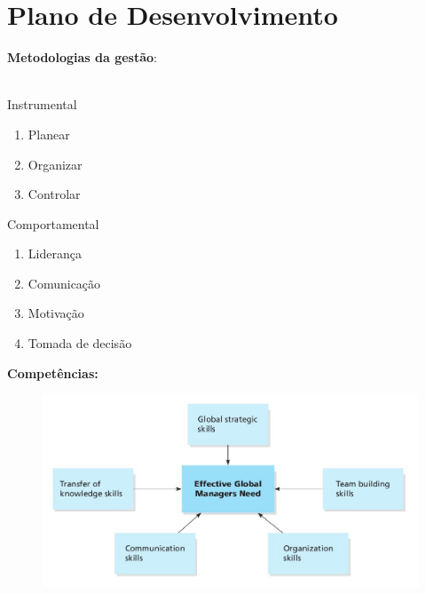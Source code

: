 \section{Plano de Desenvolvimento}
\begin{frame}
\begin{minipage}{16cm}
	\textbf{Metodologias da gestão}:\\
	\\
	\begin{minipage}{8cm}
		Instrumental
		\begin{enumerate}
			\setlength\itemsep{1.5em}
			\item Planear
			\item Organizar
			\item Controlar \\
		\end{enumerate}
	\end{minipage}
	\begin{minipage}{5cm}
		Comportamental
		\begin{enumerate}
			\setlength\itemsep{.5em}
			\item Liderança
			\item Comunicação
			\item Motivação
			\item Tomada de decisão
		\end{enumerate}
	\end{minipage}
\end{minipage}
\end{frame}
\begin{frame}
\textbf{\Large Competências:}\\
\begin{minipage}{15cm}
	\begin{figure}[ht]
		\centering
		\includegraphics[scale=0.3]{./image/Skills/Managerial_Skills_for_the_Global_Marketplace.jpg}
	\end{figure}
\end{minipage}
\end{frame}

